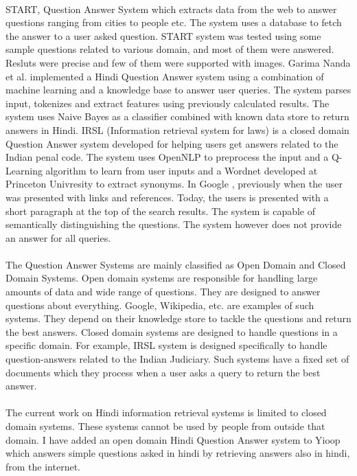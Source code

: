 \paragraph{}
START, Question Answer System \cite{katz1997annotating} which extracts data from the web to answer questions ranging from cities to people etc. The system uses a database to fetch the answer to a user asked question. START system was tested using some sample questions related to various domain, and most of them were answered. Resluts were precise and few of them were supported with images. Garima Nanda et al. implemented a Hindi Question Answer system \cite {nanda2016hindi} using a combination of machine learning and a knowledge base to answer user queries. The system parses input, tokenizes and extract features using previously calculated results. The system uses  Naive Bayes as a classifier combined with known data store to return answers in Hindi. IRSL (Information retrieval system for laws) \cite {sangeetha2017information} is a closed domain Question Answer system developed for helping users get answers related to the Indian penal code. The system uses OpenNLP to preprocess the input and a Q-Learning algorithm to learn from user inputs and a Wordnet developed at Princeton Univresity to extract synonyms. In Google \cite {alupului2016question}, previously when the user was presented with links and references. Today, the users is presented with a short paragraph at the top of the search results. The system is capable of semantically distinguishing the questions. The system however does not provide an answer for all queries. 

\paragraph{}
The Question Answer Systems are mainly classified as Open Domain and Closed Domain Systems. 
Open domain systems are responsible for handling large amounts of data and wide range of questions. They are designed to answer questions about everything. Google, Wikipedia, etc. are examples of such systems. They depend on their knowledge store to tackle the questions and return the best answers.
Closed domain systems are designed to handle questions in a specific domain. For example, IRSL system is designed specifically to handle question-answers related to the Indian Judiciary. Such systems have a fixed set of documents which they process when a user asks a query to return the best answer.

\paragraph{}
The current work on Hindi information retrieval systems is limited to closed domain systems. These systems cannot be used by people from outside that domain. I have added an open domain Hindi Question Answer system to Yioop which answers simple questions asked in hindi by retrieving answers also in hindi, from the internet. 

